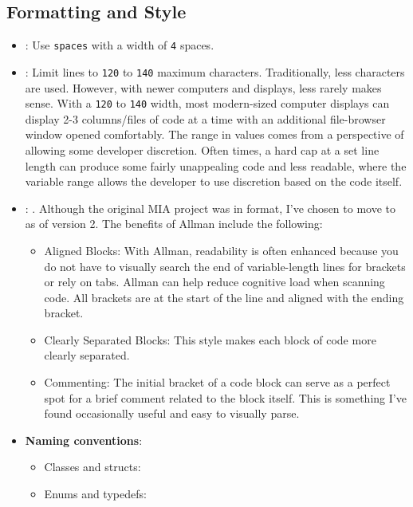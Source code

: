 \subsection{Formatting and Style}

\begin{itemize}\itemsep0em
    \item {}: Use \texttt{spaces} with a width of \texttt{4} spaces.
    \item {}: Limit lines to \texttt{120} to \texttt{140} maximum characters. Traditionally, less characters are used. However, with newer computers and displays, less rarely makes sense. With a \texttt{120} to \texttt{140} width, most modern-sized computer displays can display 2-3 columns/files of code at a time with an additional file-browser window opened comfortably. The range in values comes from a perspective of allowing some developer discretion. Often times, a hard cap at a set line length can produce some fairly unappealing code and less readable, where the variable range allows the developer to use discretion based on the code itself. 
    \item {}: . Although the original MIA project was in  format, I've chosen to move to  as of version 2. The benefits of Allman include the following:    
    \begin{itemize}\itemsep0em
        \item Aligned Blocks: With Allman, readability is often enhanced because you do not have to visually search the end of variable-length lines for brackets or rely on tabs. Allman can help reduce cognitive load when scanning code. All brackets are at the start of the line and aligned with the ending bracket. 
        \item Clearly Separated Blocks: This style makes each block of code more clearly separated.
        \item Commenting: The initial bracket of a code block can serve as a perfect spot for a brief comment related to the block itself. This is something I've found occasionally useful and easy to visually parse.
    \end{itemize}
    \item \textbf{Naming conventions}:
    \begin{itemize}\itemsep0em
        \item Classes and structs: 
        \item Enums and typedefs: 

\end{itemize}
\end{itemize}

